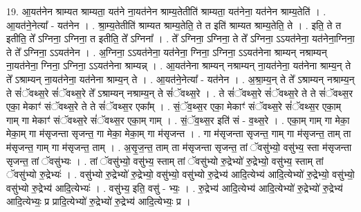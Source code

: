 \documentclass[17pt]{extarticle}
\begin{document}
19. आ॒यत॑नेन श्राम्यत श्राम्यता॒ यत॑ने ना॒यत॑नेन श्राम्य॒तेतीति॑ श्राम्यता॒ यत॑नेना॒ यत॑नेन श्राम्य॒तेति॑ । . आ॒यत॑ने॒नेत्या᳚ - यत॑नेन । . श्रा॒म्य॒तेतीति॑ श्राम्यत श्राम्य॒तेति॒ ते त इति॑ श्राम्यत श्राम्य॒तेति॒ ते । . इति॒ ते त इतीति॒ ते᳚ ऽग्निना॒ ऽग्निना॒ त इतीति॒ ते᳚ ऽग्निना᳚ । . ते᳚ ऽग्निना॒ ऽग्निना॒ ते ते᳚ ऽग्निना॒ ऽऽयत॑नेना॒ यत॑नेना॒ग्निना॒ ते ते᳚ ऽग्निना॒ ऽऽयत॑नेन । . अ॒ग्निना॒ ऽऽयत॑नेना॒ यत॑नेना॒ ग्निना॒ ऽग्निना॒ ऽऽयत॑नेना श्राम्यन् नश्राम्यन् ना॒यत॑नेना॒ ग्निना॒ ऽग्निना॒ ऽऽयत॑नेना श्राम्यन्न् । . आ॒यत॑नेना श्राम्यन् नश्राम्यन् ना॒यत॑नेना॒ यत॑नेना श्राम्य॒न् ते ते᳚ ऽश्राम्यन् ना॒यत॑नेना॒ यत॑नेना श्राम्य॒न् ते । . आ॒यत॑ने॒नेत्या᳚ - यत॑नेन । . अ॒श्रा॒म्य॒न् ते ते᳚ ऽश्राम्यन् नश्राम्य॒न् ते सं॑ॅवथ्स॒रे सं॑ॅवथ्स॒रे ते᳚ ऽश्राम्यन् नश्राम्य॒न् ते सं॑ॅवथ्स॒रे । . ते सं॑ॅवथ्स॒रे सं॑ॅवथ्स॒रे ते ते सं॑ॅवथ्स॒र एका॒ मेकाꣳ॑ संॅवथ्स॒रे ते ते सं॑ॅवथ्स॒र एका᳚म् । . सं॒ॅव॒थ्स॒र एका॒ मेकाꣳ॑ संॅवथ्स॒रे सं॑ॅवथ्स॒र एका॒म् गाम् गा मेकाꣳ॑ संॅवथ्स॒रे सं॑ॅवथ्स॒र एका॒म् गाम् । . सं॒ॅव॒थ्स॒र इति॑ सं - व॒थ्स॒रे । . एका॒म् गाम् गा मेका॒ मेका॒म् गा म॑सृजन्ता सृजन्त॒ गा मेका॒ मेका॒म् गा म॑सृजन्त । . गा म॑सृजन्ता सृजन्त॒ गाम् गा म॑सृजन्त॒ ताम् ता म॑सृजन्त॒ गाम् गा म॑सृजन्त॒ ताम् । . अ॒सृ॒ज॒न्त॒ ताम् ता म॑सृजन्ता सृजन्त॒ तां ॅवसु॑भ्यो॒ वसु॑भ्य॒ स्ता म॑सृजन्ता सृजन्त॒ तां ॅवसु॑भ्यः । . तां ॅवसु॑भ्यो॒ वसु॑भ्य॒ स्ताम् तां ॅवसु॑भ्यो रु॒द्रेभ्यो॑ रु॒द्रेभ्यो॒ वसु॑भ्य॒ स्ताम् तां ॅवसु॑भ्यो रु॒द्रेभ्यः॑ । . वसु॑भ्यो रु॒द्रेभ्यो॑ रु॒द्रेभ्यो॒ वसु॑भ्यो॒ वसु॑भ्यो रु॒द्रेभ्य॑ आदि॒त्येभ्य॑ आदि॒त्येभ्यो॑ रु॒द्रेभ्यो॒ वसु॑भ्यो॒ वसु॑भ्यो रु॒द्रेभ्य॑ आदि॒त्येभ्यः॑ । . वसु॑भ्य॒ इति॒ वसु॑ - भ्यः॒ । . रु॒द्रेभ्य॑ आदि॒त्येभ्य॑ आदि॒त्येभ्यो॑ रु॒द्रेभ्यो॑ रु॒द्रेभ्य॑ आदि॒त्येभ्यः॒ प्र प्रादि॒त्येभ्यो॑ रु॒द्रेभ्यो॑ रु॒द्रेभ्य॑ आदि॒त्येभ्यः॒ प्र । \newline
\end{document}

